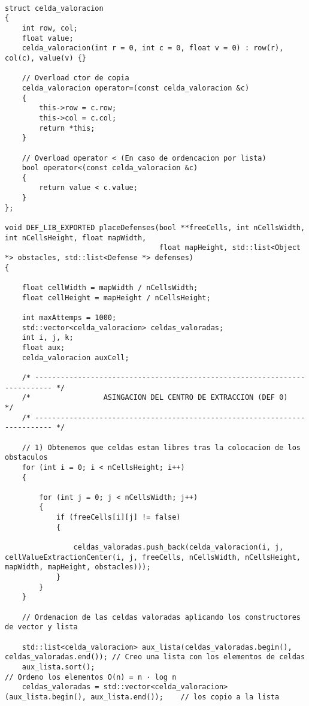 \begin{lstlisting}

struct celda_valoracion
{
    int row, col;
    float value;
    celda_valoracion(int r = 0, int c = 0, float v = 0) : row(r), col(c), value(v) {}

    // Overload ctor de copia
    celda_valoracion operator=(const celda_valoracion &c)
    {
        this->row = c.row;
        this->col = c.col;
        return *this;
    }

    // Overload operator < (En caso de ordencacion por lista)
    bool operator<(const celda_valoracion &c)
    {
        return value < c.value;
    }
};

void DEF_LIB_EXPORTED placeDefenses(bool **freeCells, int nCellsWidth, int nCellsHeight, float mapWidth,
                                    float mapHeight, std::list<Object *> obstacles, std::list<Defense *> defenses)
{

    float cellWidth = mapWidth / nCellsWidth;
    float cellHeight = mapHeight / nCellsHeight;

    int maxAttemps = 1000;
    std::vector<celda_valoracion> celdas_valoradas;
    int i, j, k;
    float aux;
    celda_valoracion auxCell;

    /* -------------------------------------------------------------------------- */
    /*                 ASINGACION DEL CENTRO DE EXTRACCION (DEF 0)                */
    /* -------------------------------------------------------------------------- */

    // 1) Obtenemos que celdas estan libres tras la colocacion de los obstaculos
    for (int i = 0; i < nCellsHeight; i++)
    {

        for (int j = 0; j < nCellsWidth; j++)
        {
            if (freeCells[i][j] != false)
            {

                celdas_valoradas.push_back(celda_valoracion(i, j, cellValueExtractionCenter(i, j, freeCells, nCellsWidth, nCellsHeight, mapWidth, mapHeight, obstacles)));
            }
        }
    }

    // Ordenacion de las celdas valoradas aplicando los constructores de vector y lista

    std::list<celda_valoracion> aux_lista(celdas_valoradas.begin(), celdas_valoradas.end()); // Creo una lista con los elementos de celdas
    aux_lista.sort();                                                                        // Ordeno los elementos O(n) = n · log n
    celdas_valoradas = std::vector<celda_valoracion>(aux_lista.begin(), aux_lista.end());    // los copio a la lista


\end{lstlisting}
